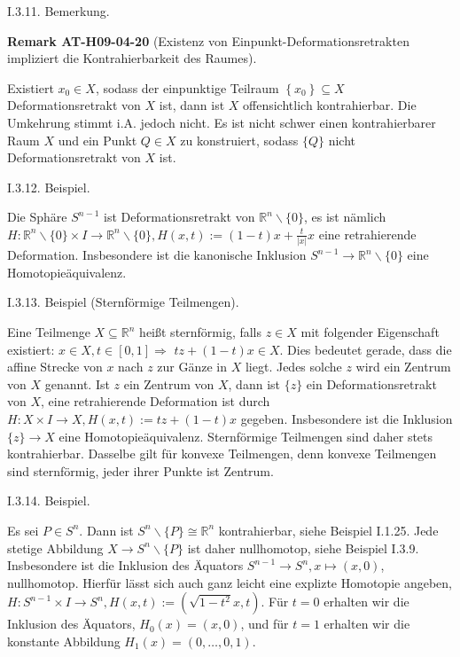 \documentclass[10pt, letterpaper]{article}
\newcommand{\CustomHeading}[3]{%
  \par\medskip\noindent%
  \textbf{#1 #2} \textnormal{(#3)}.\enskip%
}
\newenvironment{REM}[2]{\begin{unitbox}\CustomHeading{Remark}{#1}{#2}}{\end{unitbox}}
\begin{document}
I.3.11. Bemerkung. 

\begin{REM}{AT-H09-04-20}{Existenz von Einpunkt-Deformationsretrakten impliziert die Kontrahierbarkeit des Raumes}
Existiert $x_{0} \in X$, sodass der einpunktige Teilraum $\left\{x_{0}\right\} \subseteq X$ Deformationsretrakt von $X$ ist, dann ist $X$ offensichtlich kontrahierbar. Die Umkehrung stimmt i.A. jedoch nicht. Es ist nicht schwer einen kontrahierbarer Raum $X$ und ein Punkt $Q \in X$ zu konstruiert, sodass $\{Q\}$ nicht Deformationsretrakt von $X$ ist.
\end{REM}


I.3.12. Beispiel. 


Die Sphäre $S^{n-1}$ ist Deformationsretrakt von $\mathbb{R}^{n} \backslash\{0\}$, es ist nämlich $H: \mathbb{R}^{n} \backslash\{0\} \times I \rightarrow \mathbb{R}^{n} \backslash\{0\}, H(x, t):=(1-t) x+\frac{t}{|x|} x$ eine retrahierende Deformation. Insbesondere ist die kanonische Inklusion $S^{n-1} \rightarrow \mathbb{R}^{n} \backslash\{0\}$ eine Homotopieäquivalenz.




I.3.13. Beispiel (Sternförmige Teilmengen). 

Eine Teilmenge $X \subseteq \mathbb{R}^{n}$ heißt sternförmig, falls $z \in X$ mit folgender Eigenschaft existiert: $x \in X, t \in[0,1] \Rightarrow$ $t z+(1-t) x \in X$. Dies bedeutet gerade, dass die affine Strecke von $x$ nach $z$ zur Gänze in $X$ liegt. Jedes solche $z$ wird ein Zentrum von $X$ genannt. Ist $z$ ein Zentrum von $X$, dann ist $\{z\}$ ein Deformationsretrakt von $X$, eine retrahierende Deformation ist durch $H: X \times I \rightarrow X, H(x, t):=t z+(1-t) x$ gegeben. Insbesondere ist die Inklusion $\{z\} \rightarrow X$ eine Homotopieäquivalenz. Sternförmige Teilmengen sind daher stets kontrahierbar. Dasselbe gilt für konvexe Teilmengen, denn konvexe Teilmengen sind sternförmig, jeder ihrer Punkte ist Zentrum.


I.3.14. Beispiel. 

Es sei $P \in S^{n}$. Dann ist $S^{n} \backslash\{P\} \cong \mathbb{R}^{n}$ kontrahierbar, siehe Beispiel I.1.25. Jede stetige Abbildung $X \rightarrow S^{n} \backslash\{P\}$ ist daher nullhomotop, siehe Beispiel I.3.9. Insbesondere ist die Inklusion des Äquators $S^{n-1} \rightarrow S^{n}, x \mapsto(x, 0)$, nullhomotop. Hierfür lässt sich auch ganz leicht eine explizte Homotopie angeben, $H: S^{n-1} \times I \rightarrow S^{n}, H(x, t):=\left(\sqrt{1-t^{2}} x, t\right)$. Für $t=0$ erhalten wir die Inklusion des Äquators, $H_{0}(x)=(x, 0)$, und für $t=1$ erhalten wir die konstante Abbildung $H_{1}(x)=(0, \ldots, 0,1)$.\\
\end{document}
